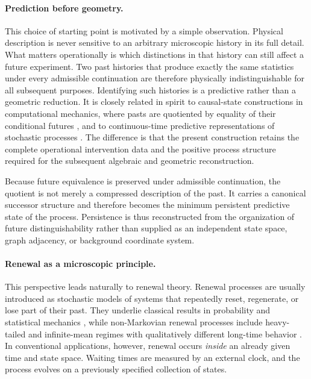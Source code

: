 \documentclass[11pt]{article}
\theoremstyle{definition}
\theoremstyle{remark}
\begin{document}
\paragraph{Prediction before geometry.}
This choice of starting point is motivated by a simple observation.  Physical
description is never sensitive to an arbitrary microscopic history in its full
detail.  What matters operationally is which distinctions in that history can
still affect a future experiment.  Two past histories that produce exactly the
same statistics under every admissible continuation are therefore physically
indistinguishable for all subsequent purposes.  Identifying such histories is
a predictive rather than a geometric reduction.  It is closely related in
spirit to causal-state constructions in computational mechanics, where pasts
are quotiented by equality of their conditional futures
\cite{shalizicrutchfield,TraversCrutchfield2014}, and to continuous-time
predictive representations of stochastic processes
\cite{MarzenCrutchfield2017,JurgensCrutchfield2021}.  The difference is that
the present construction retains the complete operational intervention data
and the positive process structure required for the subsequent algebraic and
geometric reconstruction.

Because future equivalence is preserved under admissible continuation, the
quotient is not merely a compressed description of the past.  It carries a
canonical successor structure and therefore becomes the minimum persistent
predictive state of the process.  Persistence is thus reconstructed from the
organization of future distinguishability rather than supplied as an
independent state space, graph adjacency, or background coordinate system.

\paragraph{Renewal as a microscopic principle.}
This perspective leads naturally to renewal theory.  Renewal processes are
usually introduced as stochastic models of systems that repeatedly reset,
regenerate, or lose part of their past.  They underlie classical results in
probability and statistical mechanics \cite{feller}, while non-Markovian
renewal processes include heavy-tailed and infinite-mean regimes with
qualitatively different long-time behavior
\cite{garsialamperti1962,erickson1970,caravennadoney2019}.  In conventional
applications, however, renewal occurs \emph{inside} an already given time and
state space.  Waiting times are measured by an external clock, and the process
evolves on a previously specified collection of states.
\end{document}
